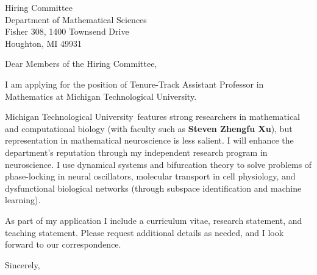 \documentclass[11pt,a4paper]{letter}
\begin{document}
\def\School{Michigan Technological University}
\begin{letter}
{Hiring Committee\\
Department of Mathematical Sciences\\
Fisher 308, 1400 Townsend Drive\\
Houghton, MI 49931}


\opening{Dear Members of the Hiring Committee,}

I am applying for the position of Tenure-Track Assistant Professor in Mathematics at \School. 



\School~features strong researchers in mathematical and computational biology (with faculty such as \textbf{Steven Zhengfu Xu}), but representation in mathematical neuroscience is less salient. I will enhance the department's reputation through my independent research program in neuroscience. I use dynamical systems and bifurcation theory to solve problems of phase-locking in neural oscillators, molecular transport in cell physiology, and dysfunctional biological networks (through subspace identification and machine learning).



As part of my application I include a curriculum vitae, research statement, and teaching statement. Please request additional details as needed, and I look forward to our correspondence.

\closing{Sincerely,}
\end{letter}
\end{document}

